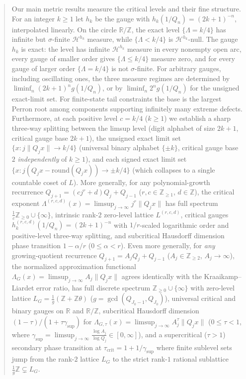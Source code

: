 \documentclass[11pt]{article}
\theoremstyle{definition}
\theoremstyle{remark}
\newcommand{\R}{\mathbb{R}}
\newcommand{\Z}{\mathbb{Z}}
\newcommand{\Lam}{\Lambda}
\begin{document}
\begin{abstract}
Our main metric results measure the critical levels and their fine structure.
For an integer $k\ge1$ let $h_k$ be the gauge with $h_k(1/Q_n)=(2k+1)^{-n}$,
interpolated linearly. On the circle $\R/\Z$, the exact level $\{\Lam=k/4\}$
has infinite but $\sigma$-finite $\mathcal H^{h_k}$ measure, while
$\{\Lam<k/4\}$ is $\mathcal H^{h_k}$-null. The gauge $h_k$ is exact: the level
has infinite $\mathcal H^{h_k}$ measure in every nonempty open arc, every gauge
of smaller order gives $\{\Lam\le k/4\}$ measure zero, and for every gauge of
larger order $\{\Lam=k/4\}$ is not $\sigma$-finite. For arbitrary gauges,
including oscillating ones, the three measure regimes are determined by
$\liminf_n (2k+1)^n g(1/Q_n)$, or by $\liminf_n 2^n g(1/Q_n)$ for the
unsigned exact-limit set. For finite-state tail constraints the base is
the largest Perron root among components supporting infinitely many
extreme defects. Furthermore, at each
positive level $c=k/4$ ($k\ge1$) we establish a sharp three-way splitting
between the limsup level (digit alphabet of size $2k+1$, critical gauge base
$2k+1$), the unsigned exact limit set $\{x:j\|Q_jx\|\to k/4\}$ (universal binary
alphabet $\{\pm k\}$, critical gauge base $2$ \emph{independently} of
$k\ge1$), and each signed exact limit set
$\{x:j(Q_jx-\mathrm{round}(Q_jx))\to\pm k/4\}$ (which collapses to a single
countable coset of $L$). More generally, for any polynomial-growth recurrence
$Q_{j+1}=(cj^r+d)Q_j+Q_{j-1}$ ($r,c\in\Z_{\ge1}$, $d\in\Z$), the critical
exponent $\Lam^{(r,c,d)}(x)=\limsup_{j\to\infty}j^r\|Q_jx\|$ has full
spectrum $\frac1c\Z_{\ge0}\cup\{\infty\}$, intrinsic rank-$2$ zero-level
lattice $L^{(r,c,d)}$, critical gauges $h_k^{(r,c,d)}(1/Q_n)=(2k+1)^{-n}$
with $1/r$-scaled logarithmic order and positive-level three-way splitting, and
subcritical Hausdorff dimension phase transition $1-\alpha/r$ ($0\le\alpha<r$).
Even more generally, for \emph{any} growing-quotient recurrence
$Q_{j+1}=A_jQ_j+Q_{j-1}$ ($A_j\in\Z_{\ge2}$, $A_j\to\infty$), the normalized
approximation functional $\Lam_G(x)=\limsup_{j\to\infty}A_j\|Q_jx\|$ agrees
identically with the Kraaikamp--Liardet error ratio, has full discrete spectrum
$\Z_{\ge0}\cup\{\infty\}$ with zero-level lattice $L_G=\frac{1}{g}(\Z+\Z\theta)$
($g=\gcd(Q_{J_0-1},Q_{J_0})$), universal critical and binary gauges on $\R$ and
$\R/\Z$, subcritical Hausdorff dimension $(1-\tau)/(1+\tau\gamma_{\sup})$ for
$\Lam_{G,\tau}(x)=\limsup_{j\to\infty}A_j^\tau\|Q_jx\|$ ($0\le\tau<1$, where
$\gamma_{\sup}=\limsup_{j\to\infty}\frac{\log A_j}{\log Q_j}\in[0,\infty]$),
and a supercritical ($\tau>1$) secondary phase transition at
$\tau_{\mathrm{crit}}=1+1/\gamma_{\sup}$ where finite sublevel sets jump from
the rank-$2$ lattice $L_G$ to the strict rank-$1$ rational sublattice
$\frac{1}{g}\Z\subsetneq L_G$.


\end{abstract}
\end{document}
